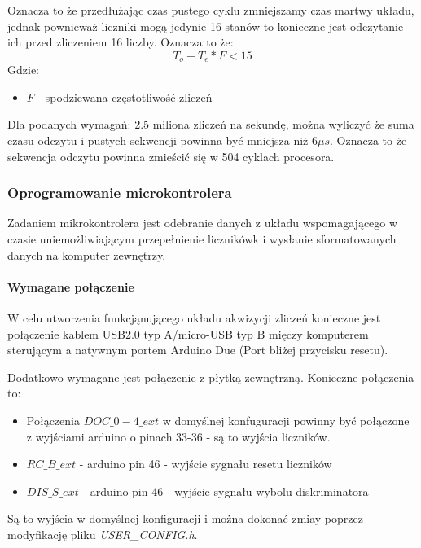 \documentclass[a4paper,12pt]{article}
\begin{document}
Oznacza to że przedłużając czas pustego cyklu zmniejszamy czas martwy układu, jednak pownieważ liczniki mogą jedynie 16 stanów to konieczne jest odczytanie ich przed zliczeniem 16 liczby. 
Oznacza to że:
\begin{equation}
        T_o+T_e * F < 15
\end{equation}
        Gdzie:
\begin{itemize}
        \item $F$ - spodziewana częstotliwość zliczeń
\end{itemize}

Dla podanych wymagań: 2.5 miliona zliczeń na sekundę, można wyliczyć że suma czasu odczytu i pustych sekwencji powinna być mniejsza niż 6$\mu s$.
Oznacza to że sekwencja odczytu powinna zmieścić się w 504 cyklach procesora. 

\subsubsection{Oprogramowanie microkontrolera}

Zadaniem mikrokontrolera jest odebranie danych z układu wspomagającego w czasie uniemożliwiającym przepełnienie licznikówk i wysłanie sformatowanych danych na komputer zewnętrzy. 

\paragraph{Wymagane połączenie}
W celu utworzenia funkcjąnującego układu akwizycji zliczeń konieczne jest połączenie kablem USB2.0 typ A/micro-USB typ B mięczy komputerem sterującym a natywnym portem Arduino Due (Port bliżej przycisku resetu).

Dodatkowo wymagane jest połączenie z płytką zewnętrzną. Konieczne połączenia to:
\begin{itemize}
        \item Połączenia $DOC\_0-4\_ext$ w domyślnej konfuguracji powinny być połączone z wyjściami arduino o pinach 33-36 - są to wyjścia liczników.
        \item $RC\_B\_ext$ - arduino pin 46 - wyjście sygnału resetu liczników 
        \item $DIS\_S\_ext$ - arduino pin 46 - wyjście sygnału wybolu diskriminatora
\end{itemize}

Są to wyjścia w domyślnej konfiguracji i można dokonać zmiay poprzez modyfikację pliku \textit{USER\_CONFIG.h}.
\end{document}
